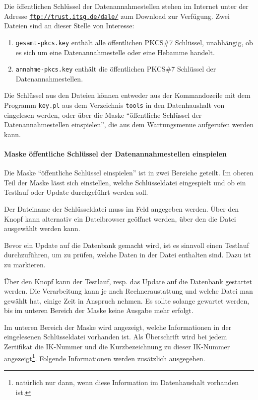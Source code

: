 Die öffentlichen Schlüssel der Datenannahmestellen stehen im Internet
unter der Adresse 
{\href{ftp://trust.itsg.de/dale/}{\nolinkurl{ftp://trust.itsg.de/dale/}}}
zum Download zur Verfügung. Zwei Dateien sind an dieser Stelle von Interesse:
\begin{enumerate}
\item
{}
\verb|gesamt-pkcs.key| enthält alle öffentlichen PKCS\#7 Schlüssel, unabhängig,
ob es sich um eine Datenannahmestelle oder eine Hebamme handelt.
\item
{}
\verb|annahme-pkcs.key| enthält die öffentlichen PKCS\#7 Schlüssel der
Datenannahmestellen.
\end{enumerate}
Die Schlüssel aus den Dateien können entweder aus der Kommandozeile 
mit dem Programm  \verb|key.pl| aus dem Verzeichnis \verb|tools| in den
Datenhaushalt von \tinyHeb\/ eingelesen werden, oder über die Maske
``öffentliche Schlüssel der Datenannahmestellen einspielen'', die aus
dem Wartungsmenue aufgerufen werden kann.


\paragraph{Maske öffentliche Schlüssel der Datenannahmestellen
einspielen}
Die Maske ``öffentliche Schlüssel einspielen'' ist in zwei Bereiche
geteilt. Im oberen Teil der Maske lässt sich einstellen, welche 
Schlüsseldatei eingespielt und ob ein Testlauf oder Update durchgeführt
werden soll.

Der Dateiname der Schlüsseldatei muss im Feld
 angegeben werden. Über den Knopf
 kann alternativ ein Dateibrowser geöffnet werden,
über den die Datei ausgewählt werden kann.

Bevor ein Update auf die Datenbank gemacht wird, ist es sinnvoll einen
Testlauf durchzuführen, um zu prüfen, welche Daten in der Datei enthalten
sind. Dazu ist  zu markieren. 

Über den Knopf  kann der Testlauf,
resp. das Update auf die Datenbank gestartet werden. Die Verarbeitung
kann je nach Rechneraustattung und welche Datei man gewählt hat, einige
Zeit in Anspruch nehmen. Es sollte solange gewartet werden, bis
im unteren Bereich der Maske keine Ausgabe mehr erfolgt.

Im unteren Bereich der Maske wird angezeigt, welche Informationen in
der eingelesenen Schlüsseldatei vorhanden ist. Als Überschrift wird
bei jedem Zertifikat die IK-Nummer und die Kurzbezeichnung zu dieser
IK-Nummer angezeigt\footnote{natürlich nur dann, wenn diese Information
im Datenhaushalt vorhanden ist.}. Folgende Informationen werden
zusätzlich ausgegeben.

